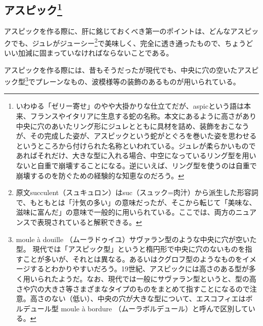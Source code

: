 \hypertarget{aspics}{%
\subsection[アスピック]{\texorpdfstring{アスピック\footnote{いわゆる「ゼリー寄せ」のやや大掛かりな仕立てだが、aspicという語は本来、フランスやイタリアに生息する蛇の名称。本文にあるように高さがあり中央に穴のあいたリング形にジュレとともに具材を詰め、装飾をおこなうが、その完成した姿が、アスピックという蛇がとぐろを巻いた姿を思わせるというところから付けられた名称といわれている。ジュレが柔らかいものであればそれだけ、大きな型に入れる場合、中空になっているリング型を用いないと自重で崩壊することになる。逆にいえば、リング型を使うのは自重で崩壊するのを防ぐための経験的な知恵なのだろう。}}{アスピック}}\label{aspics}}



アスピックを作る際に、肝に銘じておくべき第一のポイントは、どんなアスピックでも、ジュレがジューシー\footnote{原文succulent（スュキュロン）はsuc（スュック=肉汁）から派生した形容詞で、もともとは「汁気の多い」の意味だったが、そこから転じて「美味な、滋味に富んだ」の意味で一般的に用いられている。ここでは、両方のニュアンスで表現されていると解釈できる。}で美味しく、完全に透き通ったもので、ちょうどいい加減に固まっていなければならないことである。

アスピックを作る際には、昔もそうだったが現代でも、中央に穴の空いたアスピック型\footnote{moule
  à douille （ムーラドゥイユ）サヴァラン型のような中央に穴が空いた型。
  現代では「アスピック型」というと楕円形で中央に穴のないものを指すことが多いが、それとは異なる。あるいはクグロフ型のようなものをイメージするとわかりやすいだろう。19世紀、アスピックには高さのある型が多く用いられたようだ。なお、現代では一般にサヴァラン型というと、型の高さや穴の大きさ等さまざまなタイプのものをまとめて指すことになるので注意。高さのない（低い）、中央の穴が大きな型について、エスコフィエはボルデュール型
  moule à bordure （ムーラボルデュール）と呼んで区別している。}でプレーンなもの、波模様等の装飾のあるものが用いられている。

